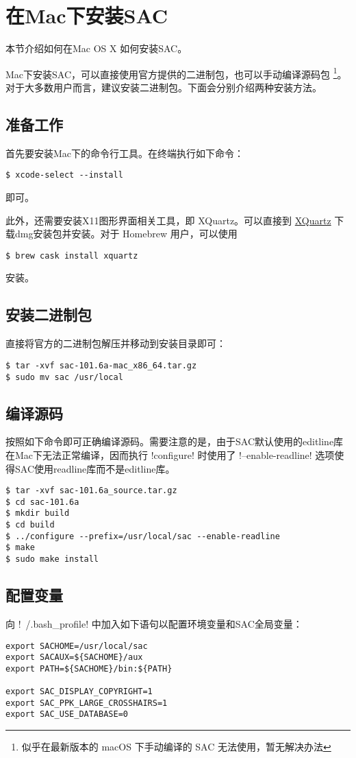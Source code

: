 \section{在Mac下安装SAC}
\label{sec:sac-install-for-mac}
本节介绍如何在Mac OS X 如何安装SAC。

Mac下安装SAC，可以直接使用官方提供的二进制包，也可以手动编译源码包
\footnote{似乎在最新版本的 macOS 下手动编译的 SAC 无法使用，暂无解决办法}。
对于大多数用户而言，建议安装二进制包。下面会分别介绍两种安装方法。

\subsection{准备工作}
首先要安装Mac下的命令行工具。在终端执行如下命令：
\begin{verbatim}
$ xcode-select --install
\end{verbatim}
即可。

此外，还需要安装X11图形界面相关工具，即 XQuartz。可以直接到 \href{http://xquartz.macosforge.org/landing/}{XQuartz}
下载dmg安装包并安装。对于 Homebrew 用户，可以使用
\begin{verbatim}
$ brew cask install xquartz
\end{verbatim}
安装。

\subsection{安装二进制包}
直接将官方的二进制包解压并移动到安装目录即可：
\begin{verbatim}
$ tar -xvf sac-101.6a-mac_x86_64.tar.gz
$ sudo mv sac /usr/local
\end{verbatim}

\subsection{编译源码}
按照如下命令即可正确编译源码。需要注意的是，由于SAC默认使用的editline库
在Mac下无法正常编译，因而执行 !configure! 时使用了
!--enable-readline! 选项使得SAC使用readline库而不是editline库。
\begin{verbatim}
$ tar -xvf sac-101.6a_source.tar.gz
$ cd sac-101.6a
$ mkdir build
$ cd build
$ ../configure --prefix=/usr/local/sac --enable-readline
$ make
$ sudo make install
\end{verbatim}

\subsection{配置变量}
向 !~/.bash_profile! 中加入如下语句以配置环境变量和SAC全局变量：
\begin{verbatim}
export SACHOME=/usr/local/sac
export SACAUX=${SACHOME}/aux
export PATH=${SACHOME}/bin:${PATH}

export SAC_DISPLAY_COPYRIGHT=1
export SAC_PPK_LARGE_CROSSHAIRS=1
export SAC_USE_DATABASE=0
\end{verbatim}

